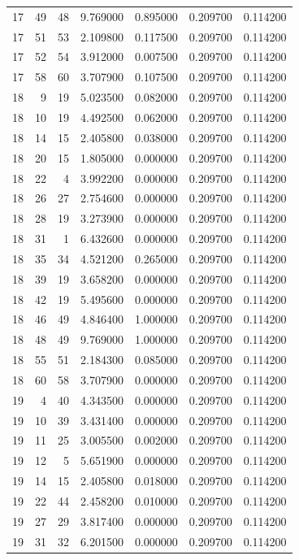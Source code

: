 \begin{table}
\begin{tabular}{rrrrrrr}
17 & 49 & 48 & 9.769000 & 0.895000 & 0.209700 & 0.114200 \\
17 & 51 & 53 & 2.109800 & 0.117500 & 0.209700 & 0.114200 \\
17 & 52 & 54 & 3.912000 & 0.007500 & 0.209700 & 0.114200 \\
17 & 58 & 60 & 3.707900 & 0.107500 & 0.209700 & 0.114200 \\
18 & 9 & 19 & 5.023500 & 0.082000 & 0.209700 & 0.114200 \\
18 & 10 & 19 & 4.492500 & 0.062000 & 0.209700 & 0.114200 \\
18 & 14 & 15 & 2.405800 & 0.038000 & 0.209700 & 0.114200 \\
18 & 20 & 15 & 1.805000 & 0.000000 & 0.209700 & 0.114200 \\
18 & 22 & 4 & 3.992200 & 0.000000 & 0.209700 & 0.114200 \\
18 & 26 & 27 & 2.754600 & 0.000000 & 0.209700 & 0.114200 \\
18 & 28 & 19 & 3.273900 & 0.000000 & 0.209700 & 0.114200 \\
18 & 31 & 1 & 6.432600 & 0.000000 & 0.209700 & 0.114200 \\
18 & 35 & 34 & 4.521200 & 0.265000 & 0.209700 & 0.114200 \\
18 & 39 & 19 & 3.658200 & 0.000000 & 0.209700 & 0.114200 \\
18 & 42 & 19 & 5.495600 & 0.000000 & 0.209700 & 0.114200 \\
18 & 46 & 49 & 4.846400 & 1.000000 & 0.209700 & 0.114200 \\
18 & 48 & 49 & 9.769000 & 1.000000 & 0.209700 & 0.114200 \\
18 & 55 & 51 & 2.184300 & 0.085000 & 0.209700 & 0.114200 \\
18 & 60 & 58 & 3.707900 & 0.000000 & 0.209700 & 0.114200 \\
19 & 4 & 40 & 4.343500 & 0.000000 & 0.209700 & 0.114200 \\
19 & 10 & 39 & 3.431400 & 0.000000 & 0.209700 & 0.114200 \\
19 & 11 & 25 & 3.005500 & 0.002000 & 0.209700 & 0.114200 \\
19 & 12 & 5 & 5.651900 & 0.000000 & 0.209700 & 0.114200 \\
19 & 14 & 15 & 2.405800 & 0.018000 & 0.209700 & 0.114200 \\
19 & 22 & 44 & 2.458200 & 0.010000 & 0.209700 & 0.114200 \\
19 & 27 & 29 & 3.817400 & 0.000000 & 0.209700 & 0.114200 \\
19 & 31 & 32 & 6.201500 & 0.000000 & 0.209700 & 0.114200 \\

\end{tabular}
\end{table}
